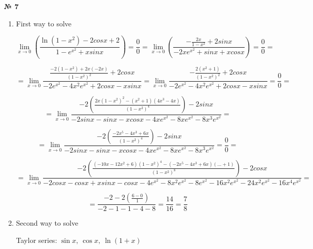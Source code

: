 \documentclass{article}
\begin{document}
\textbf{№ 7}

\begin{enumerate}

\item First way to solve

$$ \lim_{x\to 0} \left( \frac{\ln(1-x^2)-2cosx+2}{1-e^{x^2}+xsinx} \right) 
= \frac{0}{0} 
= \lim_{x\to 0} \left( \frac{-\frac{2x}{1-x^2}+2sinx}{-2xe^{x^2}+sinx+xcosx} \right)
= \frac{0}{0} 
= $$

$$ = \lim_{x\to 0} \frac{\frac{-2(1-x^2)+2x(-2x)}{(1-x^2)^2}+2cosx}{-2e^{x^2}-4x^2e^{x^2}+2cosx-xsinx} 
= \lim_{x\to 0} \frac{-\frac{2(x^2+1)}{(1-x^2)^2}+2cosx}{-2e^{x^2}-4x^2e^{x^2}+2cosx-xsinx} 
= \frac{0}{0} 
= $$

$$ = \lim_{x\to 0} \frac{-2 \left( \frac{2x(1-x^2)^2-(x^2+1)(4x^3-4x)} {(1-x^2)^4}\right)-2sinx}{-2sinx-sinx-xcosx-4xe^{x^2}-8xe^{x^2}-8x^3e^{x^2}} 
= $$

$$ = \lim_{x\to 0} \frac{-2 \left( \frac{-2x^5-4x^3+6x} {(1-x^2)^4}\right)-2sinx}{-2sinx-sinx-xcosx-4xe^{x^2}-8xe^{x^2}-8x^3e^{x^2}}
= \frac{0}{0} 
= $$

$$ = \lim_{x\to 0} \frac{-2 \left( \frac{(-10x-12x^2+6)(1-x^2)^4-(-2x^5-4x^3+6x)(... + 1)} {(1-x^2)^8}\right)-2cosx}{-2cosx-cosx+xsinx-cosx-4e^{x^2}-8x^2e^{x^2}-8e^{x^2}-16x^2e^{x^2}-24x^2e^{x^2}-16x^4e^{x^2}}
= $$

$$ = \frac{-2-2\left( \frac{6-0}{1}\right)}{-2-1-1-4-8} 
= \frac{14}{16}
= \frac{7}{8}
$$

\item Second way to solve

Taylor series: $\sin{x}, \ \cos{x}, \ \ln{(1+x)}$ 

\end{enumerate}
\end{document}
